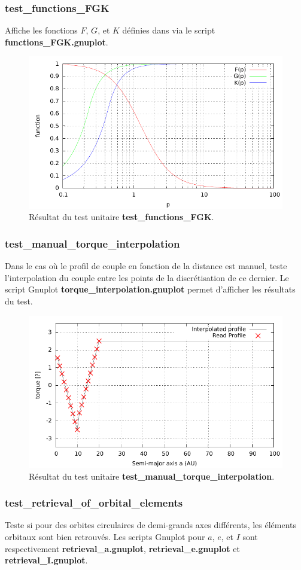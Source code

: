 \subsubsection{test\_functions\_FGK}
Affiche les fonctions $F$, $G$, et $K$ définies dans \cite{paardekooper2011torque} via le script \textbf{functions\_FGK.gnuplot}.

\begin{figure}[htbp]
\centering
\includegraphics[width=0.65\linewidth]{figure/unitary_tests/functions_FGK.pdf}
\caption{Résultat du test unitaire \textbf{test\_functions\_FGK}.}
\end{figure}

\subsubsection{test\_manual\_torque\_interpolation}
Dans le cas où le profil de couple en fonction de la distance est manuel, teste l'interpolation du couple entre les points de la discrétisation de ce dernier. Le script Gnuplot \textbf{torque\_interpolation.gnuplot} permet d'afficher les résultats du test.

\begin{figure}[htbp]
\centering
\includegraphics[width=0.65\linewidth]{figure/unitary_tests/torque_interpolation.pdf}
\caption{Résultat du test unitaire \textbf{test\_manual\_torque\_interpolation}.}
\end{figure}

\subsubsection{test\_retrieval\_of\_orbital\_elements}
Teste si pour des orbites circulaires de demi-grands axes différents, les éléments orbitaux sont bien retrouvés. Les scripts Gnuplot pour $a$, $e$, et $I$ sont respectivement \textbf{retrieval\_a.gnuplot}, \textbf{retrieval\_e.gnuplot} et \textbf{retrieval\_I.gnuplot}.

